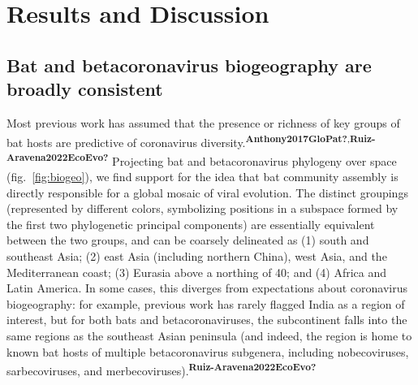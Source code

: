 \documentclass[10pt,oneside]{article}
\begin{document}
\hypertarget{results-and-discussion}{%
\section{Results and Discussion}\label{results-and-discussion}}

\hypertarget{bat-and-betacoronavirus-biogeography-are-broadly-consistent}{%
\subsection{Bat and betacoronavirus biogeography are broadly
consistent}\label{bat-and-betacoronavirus-biogeography-are-broadly-consistent}}

Most previous work has assumed that the presence or richness of key
groups of bat hosts are predictive of coronavirus
diversity.\textsuperscript{\textbf{Anthony2017GloPat?},\textbf{Ruiz-Aravena2022EcoEvo?}}
Projecting bat and betacoronavirus phylogeny over space
(fig.~\ref{fig:biogeo}), we find support for the idea that bat community
assembly is directly responsible for a global mosaic of viral evolution.
The distinct groupings (represented by different colors, symbolizing
positions in a subspace formed by the first two phylogenetic principal
components) are essentially equivalent between the two groups, and can
be coarsely delineated as (1) south and southeast Asia; (2) east Asia
(including northern China), west Asia, and the Mediterranean coast; (3)
Eurasia above a northing of 40; and (4) Africa and Latin America. In
some cases, this diverges from expectations about coronavirus
biogeography: for example, previous work has rarely flagged India as a
region of interest, but for both bats and betacoronaviruses, the
subcontinent falls into the same regions as the southeast Asian
peninsula (and indeed, the region is home to known bat hosts of multiple
betacoronavirus subgenera, including nobecoviruses, sarbecoviruses, and
merbecoviruses).\textsuperscript{\textbf{Ruiz-Aravena2022EcoEvo?}}
\end{document}
